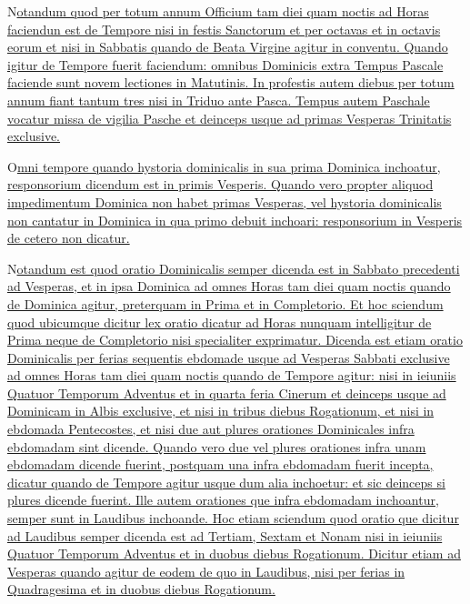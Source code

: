 \begin{multicols*}{2}

{\color{Red} }
\lettrine[lines=3]{\zallmancaps \color{Blue} N}{}\ul{otandum quod per totum annum Officium tam diei quam noctis ad Horas faciendun est de Tempore nisi in festis Sanctorum et per octavas et in octavis eorum et nisi in Sabbatis quando de Beata Virgine agitur in conventu. Quando igitur de Tempore fuerit faciendum: omnibus Dominicis extra Tempus Pascale faciende sunt novem lectiones in Matutinis. In profestis autem diebus per totum annum fiant tantum tres nisi in Triduo ante Pasca. Tempus autem Paschale vocatur missa de vigilia Pasche et deinceps usque ad primas Vesperas Trinitatis exclusive.}

{\color{Red} }
\lettrine[lines=2]{\zallmancaps \color{Red} O}{}\ul{mni tempore quando hystoria dominicalis in sua prima Dominica inchoatur, responsorium dicendum est in primis Vesperis. Quando vero propter aliquod impedimentum Dominica non habet primas Vesperas, vel hystoria dominicalis non cantatur in Dominica in qua primo debuit inchoari: responsorium in Vesperis de cetero non dicatur.}

{\color{Red} }
\lettrine[lines=2]{\zallmancaps \color{Blue} N}{}\ul{otandum est quod oratio Dominicalis semper dicenda est in Sabbato precedenti ad Vesperas, et in ipsa Dominica ad omnes Horas tam diei quam noctis quando de Dominica agitur, preterquam in Prima et in Completorio. Et hoc sciendum quod ubicumque dicitur lex oratio dicatur ad Horas nunquam intelligitur de Prima neque de Completorio nisi specialiter exprimatur. Dicenda est etiam oratio Dominicalis per ferias sequentis ebdomade usque ad Vesperas Sabbati exclusive ad omnes Horas tam diei quam noctis quando de Tempore agitur: nisi in ieiuniis Quatuor Temporum Adventus et in quarta feria Cinerum et deinceps usque ad Dominicam in Albis exclusive, et nisi in tribus diebus Rogationum, et nisi in ebdomada Pentecostes, et nisi due aut plures orationes Dominicales infra ebdomadam sint dicende. Quando vero due vel plures orationes infra unam ebdomadam dicende fuerint, postquam una infra ebdomadam fuerit incepta, dicatur quando de Tempore agitur usque dum alia inchoetur: et sic deinceps si plures dicende fuerint.
Ille autem orationes que infra ebdomadam inchoantur, semper sunt in Laudibus inchoande. Hoc etiam sciendum quod oratio que dicitur ad Laudibus semper dicenda est ad Tertiam, Sextam et Nonam nisi in ieiuniis Quatuor Temporum Adventus et in duobus diebus Rogationum. Dicitur etiam ad Vesperas quando agitur de eodem de quo in Laudibus, nisi per ferias in Quadragesima et in duobus diebus Rogationum.}


\end{multicols*}
